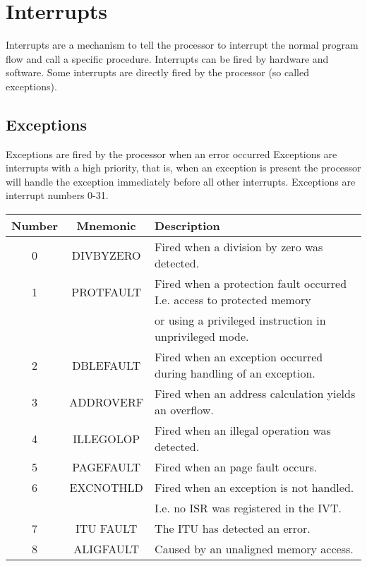 \section{Interrupts}
\label{sec:interrupts}

Interrupts are a mechanism to tell the processor to interrupt the normal program flow and call a specific
procedure. Interrupts can be fired by hardware and software. Some interrupts are directly fired by the processor (so called
exceptions).

\subsection{Exceptions}
\label{sec:exceptions}

Exceptions are fired by the processor when an error occurred Exceptions are interrupts with a high priority, that is, when
an exception is present the processor will handle the exception immediately before all other interrupts. Exceptions are interrupt
numbers 0-31. 

\begin{tabular}{ | c | c | l | }
	\hline                        
	\textbf{Number} & \textbf{Mnemonic} & \textbf{Description} \\
	\hline
	0 & DIVBYZERO & Fired when a division by zero was detected. \\
	\hline
	1 & PROTFAULT & Fired when a protection fault occurred I.e. access to protected memory \\
	  &           & or using a privileged instruction in unprivileged mode. \\
	\hline
	2 & DBLEFAULT & Fired when an exception occurred during handling of an exception. \\
	\hline
	3 & ADDROVERF & Fired when an address calculation yields an overflow. \\
	\hline
	4 & ILLEGOLOP & Fired when an illegal operation was detected. \\
	\hline
	5 & PAGEFAULT & Fired when an page fault occurs. \\
	\hline 
	6 & EXCNOTHLD & Fired when an exception is not handled. \\
	  &           & I.e. no ISR was registered in the \Gls{IVT}. \\
	\hline
	7 & ITU FAULT & The ITU has detected an error. \\
	\hline
	8 & ALIGFAULT & Caused by an unaligned memory access. \\
	\hline
\end{tabular}

